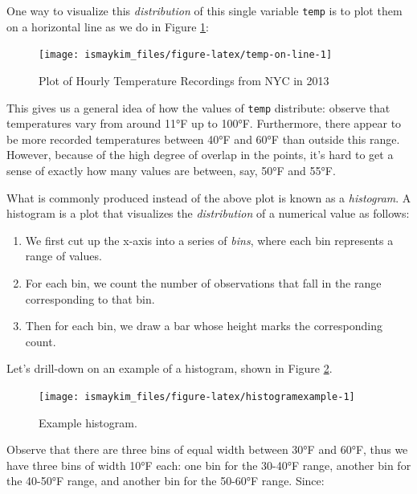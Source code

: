 \documentclass[12pt, krantz2,]{krantz}
\providecommand{\tightlist}{%
  \setlength{\itemsep}{0pt}\setlength{\parskip}{0pt}}
\begin{document}
One way to visualize this \emph{distribution} of this single variable \texttt{temp} is to plot them on a horizontal line as we do in Figure \ref{fig:temp-on-line}:

\begin{figure}

{\centering \texttt{[image: ismaykim\_files/figure-latex/temp-on-line-1]} 

}

\caption{Plot of Hourly Temperature Recordings from NYC in 2013}\label{fig:temp-on-line}
\end{figure}

This gives us a general idea of how the values of \texttt{temp} distribute: observe that temperatures vary from around 11°F up to 100°F. Furthermore, there appear to be more recorded temperatures between 40°F and 60°F than outside this range. However, because of the high degree of overlap in the points, it's hard to get a sense of exactly how many values are between, say, 50°F and 55°F.

What is commonly produced instead of the above plot is known as a \emph{histogram}. A histogram is a plot that visualizes the \emph{distribution} of a numerical value as follows:

\begin{enumerate}
\def\labelenumi{\arabic{enumi}.}
\tightlist
\item
  We first cut up the x-axis into a series of \emph{bins}, where each bin represents a range of values.
\item
  For each bin, we count the number of observations that fall in the range corresponding to that bin.
\item
  Then for each bin, we draw a bar whose height marks the corresponding count.
\end{enumerate}

Let's drill-down on an example of a histogram, shown in Figure \ref{fig:histogramexample}.

\begin{figure}

{\centering \texttt{[image: ismaykim\_files/figure-latex/histogramexample-1]} 

}

\caption{Example histogram.}\label{fig:histogramexample}
\end{figure}

Observe that there are three bins of equal width between 30°F and 60°F, thus we have three bins of width 10°F each: one bin for the 30-40°F range, another bin for the 40-50°F range, and another bin for the 50-60°F range. Since:
\end{document}
